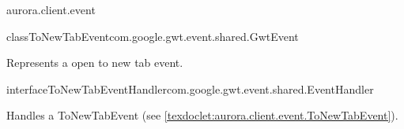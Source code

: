 \begin{texdocpackage}{aurora.client.event}
\begin{texdocclass}{class}{ToNewTabEvent}{com.google.gwt.event.shared.GwtEvent}{}
\label{texdoclet:aurora.client.event.ToNewTabEvent}
\begin{texdocclassintro}
Represents a open to new tab event.\end{texdocclassintro}
\begin{texdocclassfields}
\end{texdocclassfields}
\begin{texdocclassconstructors}
\end{texdocclassconstructors}
\begin{texdocclassmethods}
\end{texdocclassmethods}
\end{texdocclass}


\begin{texdocclass}{interface}{ToNewTabEventHandler}{}{com.google.gwt.event.shared.EventHandler}
\label{texdoclet:aurora.client.event.ToNewTabEventHandler}
\begin{texdocclassintro}
Handles a ToNewTabEvent (see \ref{texdoclet:aurora.client.event.ToNewTabEvent}).\end{texdocclassintro}
\begin{texdocclassmethods}
\end{texdocclassmethods}
\end{texdocclass}


\end{texdocpackage}



